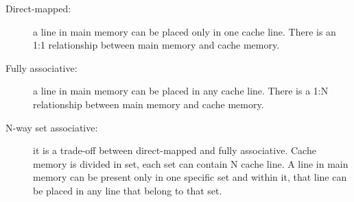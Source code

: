 \begin{description}
\begin{description}
\item [Direct-mapped:] a line in main memory can be placed only in one cache line. There is an 1:1 relationship between main memory and cache memory.
\item [Fully associative:] a line in main memory can be placed in any cache line. There is a 1:N relationship between main memory and cache memory.
\item [N-way set associative:] it is a trade-off between direct-mapped and fully associative. Cache memory is divided in set, each set can contain N cache 
line. A line in main memory can be present only in one specific set and within it, that line can be placed in any line that belong to that set.
\end{description}

\begin{figure}[htbp]
 \centering%
  \qquad\qquad
 \caption{}
\end{figure}



\end{description}
